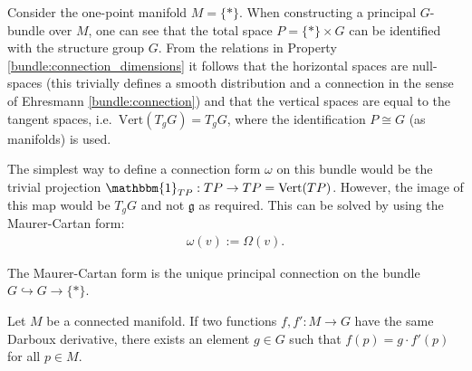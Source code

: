     \begin{construct}
        Consider the one-point manifold $M=\{\ast\}$. When constructing a principal $G$-bundle over $M$, one can see that the total space $P=\{\ast\}\times G$ can be identified with the structure group $G$. From the relations in Property \ref{bundle:connection_dimensions} it follows that the horizontal spaces are null-spaces (this trivially defines a smooth distribution and a connection in the sense of Ehresmann \ref{bundle:connection}) and that the vertical spaces are equal to the tangent spaces, i.e.~$\mathrm{Vert}(T_gG)=T_gG$, where the identification $P\cong G$ (as manifolds) is used.

        The simplest way to define a connection form $\omega$ on this bundle would be the trivial projection $\mathbbm{1}_{TP}:TP\rightarrow TP=\mathrm{Vert}(TP)$. However, the image of this map would be $T_gG$ and not $\mathfrak{g}$ as required. This can be solved by using the Maurer-Cartan form:
        \begin{gather}
            \omega(v) := \Omega(v).
        \end{gather}
    \end{construct}
    \begin{property}
        The Maurer-Cartan form is the unique principal connection on the bundle $G\hookrightarrow G\rightarrow\{\ast\}$.
    \end{property}

    \begin{property}
        Let $M$ be a connected manifold. If two functions $f,f':M\rightarrow G$ have the same Darboux derivative, there exists an element $g\in G$ such that $f(p)=g\cdot f'(p)$ for all $p\in M$.
    \end{property}

